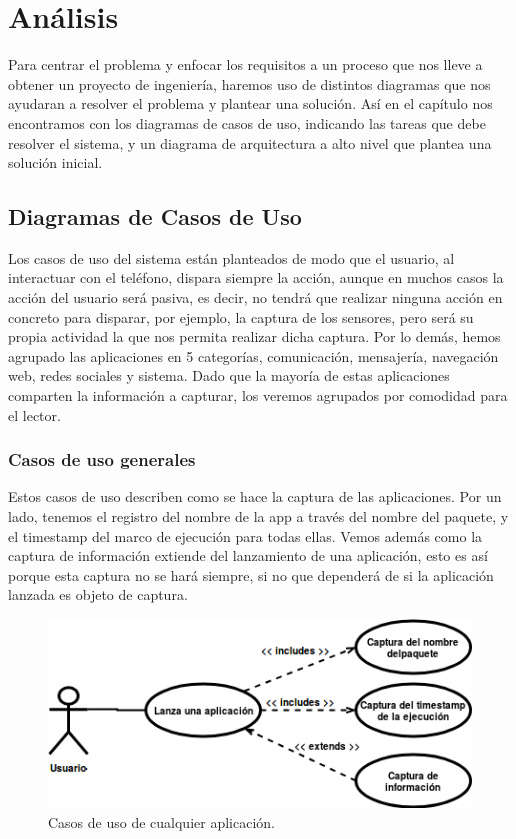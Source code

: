 \documentclass[12pt,a4paper,oneside]{book} %
\begin{document}
\chapter{Análisis}
Para centrar el problema y enfocar los requisitos a un proceso que nos lleve a obtener un proyecto de ingeniería, haremos uso de distintos diagramas que nos ayudaran a resolver el problema y plantear una solución. Así en el capítulo nos encontramos con los diagramas de casos de uso, indicando las tareas que debe resolver el sistema, y un diagrama de arquitectura a alto nivel que plantea una solución inicial. 
\section{Diagramas de Casos de Uso}
Los casos de uso del sistema están planteados de modo que el usuario, al interactuar con el teléfono, dispara siempre la acción, aunque en muchos casos la acción del usuario será pasiva, es decir, no tendrá que realizar ninguna acción en concreto para disparar, por ejemplo, la captura de los sensores, pero será su propia actividad la que nos permita realizar dicha captura. 
\newline
\newline
Por lo demás, hemos agrupado las aplicaciones en 5 categorías, comunicación, mensajería, navegación web, redes sociales y sistema. Dado que la mayoría de estas aplicaciones comparten la información a capturar, los veremos agrupados por comodidad para el lector. 
\subsection{Casos de uso generales}
Estos casos de uso describen como se hace la captura de las aplicaciones. Por un lado, tenemos el registro del nombre de la app a través del nombre del paquete, y el timestamp del marco de ejecución para todas ellas. Vemos además como la captura de información extiende del lanzamiento de una aplicación, esto es así porque esta captura no se hará siempre, si no que dependerá de si la aplicación lanzada es objeto de captura. 
\begin{figure}[H]
	\begin{center}
		\includegraphics[scale=0.7]{pictures/usecases/usecases01.png} %
	\end{center}
	\caption[Casos de uso de cualquier aplicación.]{Casos de uso de cualquier aplicación.}
\end{figure}
\end{document}
